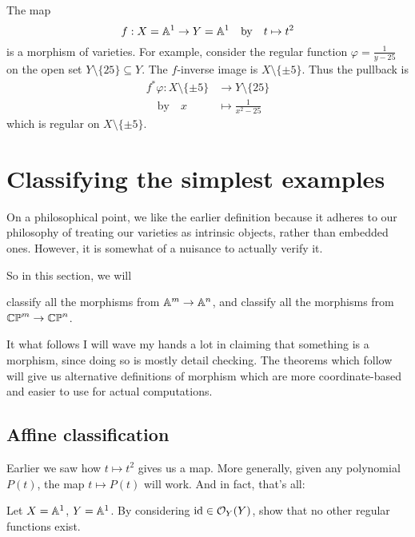 \begin{example}
	The map 
	\[ f : X = \mathbb A^1 \to Y = \mathbb A^1 \quad\text{by}\quad t \mapsto t^2 \]
	is a morphism of varieties.
	For example, consider the regular function $\varphi = \frac{1}{y-25}$ on
	the open set $Y \setminus \{25\} \subseteq Y$.
	The $f$-inverse image is $X \setminus \{\pm5\}$.
	Thus the pullback is
	\begin{align*}
		f^\ast\varphi : X \setminus \{\pm5\} &\to Y \setminus \{25\} \\
		\quad\text{by}\quad x &\mapsto \frac{1}{x^2-25}
	\end{align*}
	which is regular on $X \setminus \{\pm5\}$.
\end{example}

\section{Classifying the simplest examples}

On a philosophical point, we like the earlier definition because
it adheres to our philosophy of treating our
varieties as intrinsic objects, rather than embedded ones.
However, it is somewhat of a nuisance to actually verify it.

So in this section, we will
\begin{itemize}
	\ii classify all the morphisms from $\mathbb A^m \to \mathbb A^n$, and
	\ii classify all the morphisms from $\mathbb{CP}^m \to \mathbb{CP}^n$.
\end{itemize}
It what follows I will wave my hands a lot in claiming
that something is a morphism, since doing so is mostly detail checking.
The theorems which follow will give us alternative definitions
of morphism which are more coordinate-based
and easier to use for actual computations.

\subsection{Affine classification}
Earlier we saw how $t \mapsto t^2$ gives us a map.
More generally, given any polynomial $P(t)$,
the map $t \mapsto P(t)$ will work.
And in fact, that's all:
\begin{exercise}
	Let $X = \mathbb A^1$, $Y = \mathbb A^1$.
	By considering $\mathrm{id} \in \mathcal O_Y(Y)$, show that no other
	regular functions exist.
\end{exercise}

